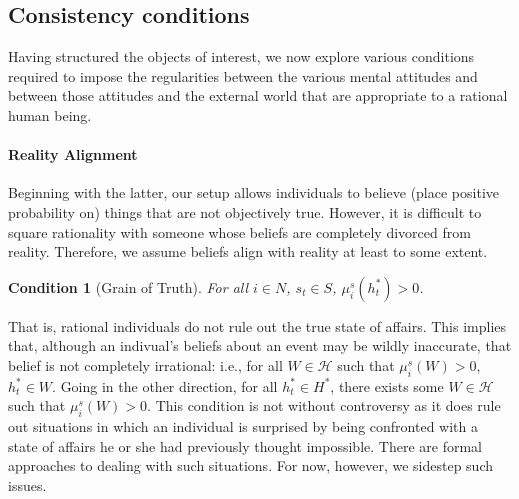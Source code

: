 \documentclass[
11pt,
titlepage,
reqno,
]{article}%
\newtheorem{condition}{Condition}
\theoremstyle{definition}
\begin{document}
	
	\subsection{Consistency conditions\label{sec:consistencies}}
	Having structured the objects of interest, we now explore various conditions required to impose the regularities between the various mental attitudes and between those attitudes and the external world that are appropriate to a rational human being. 
	
	\paragraph{Reality Alignment\label{para: reality alignment}} 
	Beginning with the latter, our setup allows individuals to believe (place positive probability on) things that are not objectively true. 
	However, it is difficult to square rationality with someone whose beliefs are completely divorced from reality. 
	Therefore, we assume beliefs align with reality at least to some extent.
	\begin{condition}[Grain of Truth]\label{cond:grain of truth}
		For all $i\in N$, $s_t\in S$, $\mu_i^s(h^\ast_t)>0$.
	\end{condition}
	\noindent That is, rational individuals do not rule out the true state of affairs. 
	This implies that, although an indivual's beliefs about an event may be wildly inaccurate, that belief is not completely irrational: i.e., for all $W\in \mathcal{H}$ such that $\mu_i^s(W)>0$, $h^\ast_t\in W$. 
	Going in the other direction, for all $h^\ast_t\in H^\ast$, there exists some $W\in \mathcal{H}$ such that $\mu_i^s(W)>0$.
	This condition is not without controversy as it does rule out situations in which an individual is surprised by being confronted with a state of affairs he or she had previously thought impossible.
	There are formal approaches to dealing with such situations.
	For now, however, we sidestep such issues.
	
\end{document}
